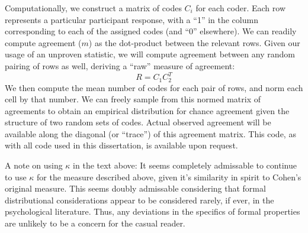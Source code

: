 Computationally, we construct a matrix of codes $C_i$ for each coder.
Each row represents a particular participant response, with a “1” in the column
corresponding to each of the assigned codes (and “0” elsewhere). We can readily
compute agreement ($m$) as the dot-product between the relevant rows. Given our
usage of an unproven statistic, we will compute agreement between any random
pairing of rows as well, deriving a “raw” measure of agreement: \[R = C_1C_2^T\]
We then compute the mean number of codes for each pair of rows, and norm each
cell by that number. We can freely sample from this normed matrix of agreements
to obtain an empirical distribution for chance agreement given the structure of
two random sets of codes. Actual observed agreement will be available along the
diagonal (or “trace”) of this agreement matrix. This code, as with all code used
in this dissertation, is available upon request.

A note on using $\kappa$ in the text above: It seems completely admissable to
continue to use $\kappa$ for the measure described above, given it's similarity
in spirit to Cohen's original measure. This seems doubly admissable considering
that formal distributional considerations appear to be considered rarely, if
ever, in the psychological literature. Thus, any deviations in the specifics of
formal properties are unlikely to be a concern for the casual reader.
